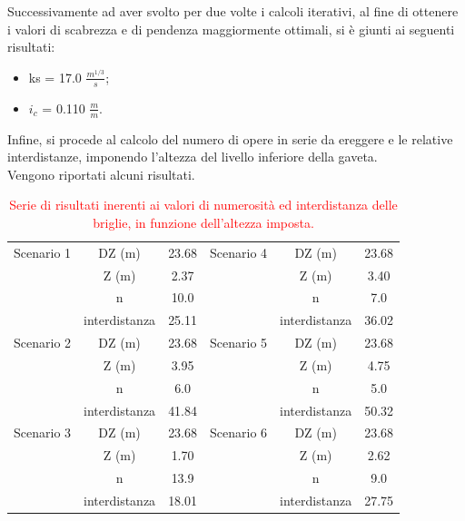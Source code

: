 Successivamente ad aver svolto per due volte i calcoli iterativi, al fine di ottenere i valori di scabrezza e di pendenza maggiormente ottimali, si è giunti ai seguenti risultati:
\begin{itemize}
    \item ks = 17.0 $\frac{m^{1/3}}{s}$;
    \item $i_c$ = 0.110 $\frac{m}{m}$.
\end{itemize}

Infine, si procede al calcolo del numero di opere in serie da ereggere e le relative interdistanze, imponendo l'altezza del livello inferiore della gaveta.\\
Vengono riportati alcuni risultati.
\begin{table}[H] \centering
    \caption{\textcolor{red}{Serie di risultati inerenti ai valori di numerosità ed interdistanza delle briglie, in funzione dell'altezza imposta.}}
    \begin{tabular}{ccc|ccc}
        \toprule
    Scenario 1 & DZ (m)& 23.68 & Scenario 4 & DZ (m) & 23.68 \\
& Z (m)         & 2.37  &            & Z (m)         & 3.40  \\
& n             & 10.0  &            & n             & 7.0   \\
& interdistanza & 25.11 &            & interdistanza & 36.02 \\
\midrule
Scenario 2 & DZ (m)        & 23.68 & Scenario 5 & DZ (m) & 23.68 \\
& Z (m)         & 3.95  &            & Z (m)         & 4.75  \\
& n             & 6.0   &            & n             & 5.0   \\
& interdistanza & 41.84 &            & interdistanza & 50.32 \\
    \midrule
Scenario 3 & DZ (m)        & 23.68 & Scenario 6 & DZ (m)        & 23.68 \\
& Z (m)         & 1.70  &            & Z (m)         & 2.62  \\
& n             & 13.9  &            & n             & 9.0   \\
& interdistanza & 18.01 &            & interdistanza & 27.75 \\
\bottomrule
\end{tabular}
\end{table}
